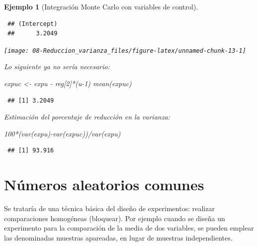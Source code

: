 \documentclass[
  10pt,
]{book}
\newenvironment{Shaded}{\begin{snugshade}}{\end{snugshade}}
\newcommand{\DecValTok}[1]{\textcolor[rgb]{0.00,0.00,0.81}{#1}}
\newcommand{\FunctionTok}[1]{\textcolor[rgb]{0.00,0.00,0.00}{#1}}
\newcommand{\NormalTok}[1]{#1}
\newcommand{\OtherTok}[1]{\textcolor[rgb]{0.56,0.35,0.01}{#1}}
\newcommand{\SpecialCharTok}[1]{\textcolor[rgb]{0.00,0.00,0.00}{#1}}
\theoremstyle{break}
\newtheorem{example}{Ejemplo}[chapter]
\theoremstyle{nonumberplain}
\begin{document}
\begin{example}[Integración Monte Carlo con variables de control]
\begin{verbatim}
 ## (Intercept) 
 ##      3.2049
\end{verbatim}

\begin{center}\texttt{[image: 08-Reduccion\_varianza\_files/figure-latex/unnamed-chunk-13-1]} \end{center}

Lo siguiente ya no sería necesario:

\begin{Shaded}
\begin{Highlighting}[]
\NormalTok{expuc }\OtherTok{\textless{}{-}}\NormalTok{ expu }\SpecialCharTok{{-}}\NormalTok{ reg[}\DecValTok{2}\NormalTok{]}\SpecialCharTok{*}\NormalTok{(u}\DecValTok{{-}1}\NormalTok{)}
\FunctionTok{mean}\NormalTok{(expuc)  }
\end{Highlighting}
\end{Shaded}

\begin{verbatim}
 ## [1] 3.2049
\end{verbatim}

Estimación del porcentaje de reducción en la varianza:

\begin{Shaded}
\begin{Highlighting}[]
\DecValTok{100}\SpecialCharTok{*}\NormalTok{(}\FunctionTok{var}\NormalTok{(expu)}\SpecialCharTok{{-}}\FunctionTok{var}\NormalTok{(expuc))}\SpecialCharTok{/}\FunctionTok{var}\NormalTok{(expu)}
\end{Highlighting}
\end{Shaded}

\begin{verbatim}
 ## [1] 93.916
\end{verbatim}

\end{example}

\hypertarget{nuxfameros-aleatorios-comunes}{%
\section{Números aleatorios comunes}\label{nuxfameros-aleatorios-comunes}}

Se trataría de una técnica básica del diseño de experimentos:
realizar comparaciones homogéneas (bloquear).
Por ejemplo cuando se diseña un experimento para la comparación
de la media de dos variables, se pueden emplear las denominadas
muestras apareadas, en lugar de muestras independientes.
\end{document}
